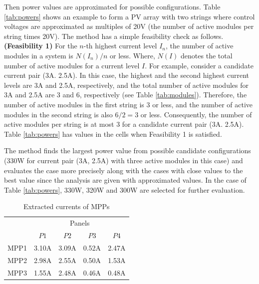 \documentclass[conference]{IEEEtran}
\begin{document}
Then power values are approximated for possible configurations. Table \ref{tab:powers} shows an example to form a PV array with two strings where control voltages are approximated as multiples of 20V (the number of active modules per string times 20V). The method has a simple feasibility check as follows. \newline{}
\textbf{(Feasibility 1)} For the $n$-th highest current level $I_{n}$, the number of active modules in a system is $N(I_{n}) / n$ or less. \newline{}
Where, $N(I)$ denotes the total number of active modules for a current level $I$. 
For example, consider a candidate current pair (3A. 2.5A). In this case, the highest and the second highest current levels are 3A and 2.5A, respectively, and the total number of active modules for 3A and 2.5A are 3 and 6, respectively (see Table \ref{tab:modules}). Therefore, the number of active modules in the first string is 3 or less, and the number of active modules in the second string is also $ 6/2  = 3$ or less. Consequently, the number of active modules per string is at most 3 for a candidate current pair (3A. 2.5A). Table \ref{tab:powers} has values in the cells when Feasibility 1 is satisfied. 

The method finds the largest power value from possible candidate configurations (330W for current pair (3A, 2.5A) with three active modules in this case) and evaluates the case more precisely along with the cases with close values to the best value since the analysis are given with approximated values. In the case of Table \ref{tab:powers}, 330W, 320W and 300W are selected for further evaluation. 

\begin{table}[t]
\caption{Extracted currents of MPPs}
\label{tab:monitored}
\centering
\begin{tabular}{c|rrrr}
\hline\hline
       &    	\multicolumn{4}{c}{Panels}								\\
	&	\multicolumn{1}{c}{$P1$}	&	\multicolumn{1}{c}{$P2$}	&	\multicolumn{1}{c}{$P3$}	&	\multicolumn{1}{c}{$P4$}	\\ \hline
MPP1	&	3.10A	&	3.09A	&	0.52A	&	2.47A	\\ \hline
MPP2	&	2.98A	&	2.55A	&	0.50A	&	1.53A	\\ \hline
MPP3	&	1.55A	&	2.48A	&	0.46A	&	0.48A	\\ \hline
\end{tabular}
\end{table}
\end{document}
